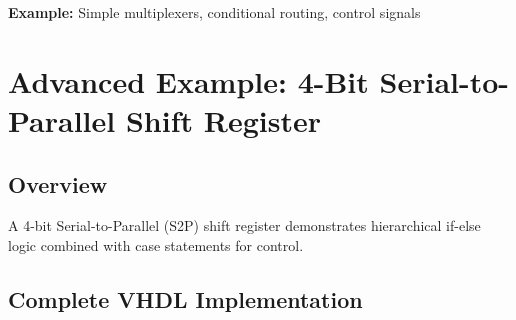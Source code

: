 \documentclass[12pt,a4paper]{article}
\begin{document}
\textbf{Example:} Simple multiplexers, conditional routing, control signals

\newpage
\section{Advanced Example: 4-Bit Serial-to-Parallel Shift Register}

\subsection{Overview}

A 4-bit Serial-to-Parallel (S2P) shift register demonstrates hierarchical if-else logic combined with case statements for control.

\subsection{Complete VHDL Implementation}
\end{document}
